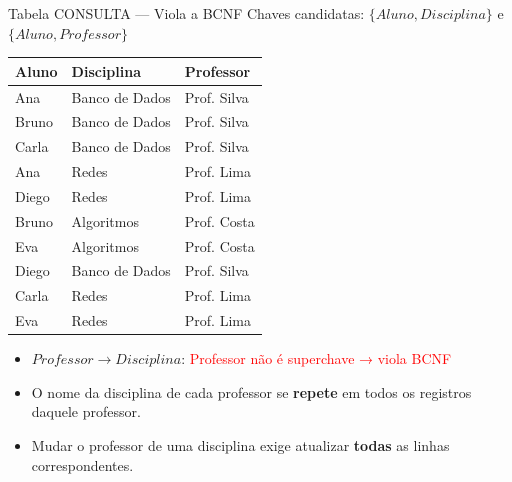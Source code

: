 \documentclass[9pt]{beamer}
\begin{document}
\begin{frame}{Tabela CONSULTA — Viola a BCNF}
\small
Chaves candidatas: $\{Aluno, Disciplina\}$ e $\{Aluno, Professor\}$
\vspace{0.2cm}
\centering
\begin{tabular}{|l|l|l|}
  \hline
  \textbf{Aluno}  & \textbf{Disciplina} & \textbf{Professor} \\ \hline
  Ana     & Banco de Dados    & \color{red}Prof. Silva  \\ \hline
  Bruno   & Banco de Dados    & \color{red}Prof. Silva  \\ \hline
  Carla   & Banco de Dados    & \color{red}Prof. Silva  \\ \hline
  Ana     & Redes             & \color{red}Prof. Lima   \\ \hline
  Diego   & Redes             & \color{red}Prof. Lima   \\ \hline
  Bruno   & Algoritmos        & Prof. Costa  \\ \hline
  Eva     & Algoritmos        & Prof. Costa  \\ \hline
  Diego   & Banco de Dados    & \color{red}Prof. Silva  \\ \hline
  Carla   & Redes             & \color{red}Prof. Lima   \\ \hline
  Eva     & Redes             & \color{red}Prof. Lima   \\ \hline
\end{tabular}

\vspace{0.3cm}
\flushleft
\begin{itemize}
  \item $Professor \to Disciplina$: \textcolor{red}{Professor não é superchave → viola BCNF}
  \item O nome da disciplina de cada professor se \textbf{repete} em todos os registros daquele professor.
  \item Mudar o professor de uma disciplina exige atualizar \textbf{todas} as linhas correspondentes.
\end{itemize}
\end{frame}
\end{document}
